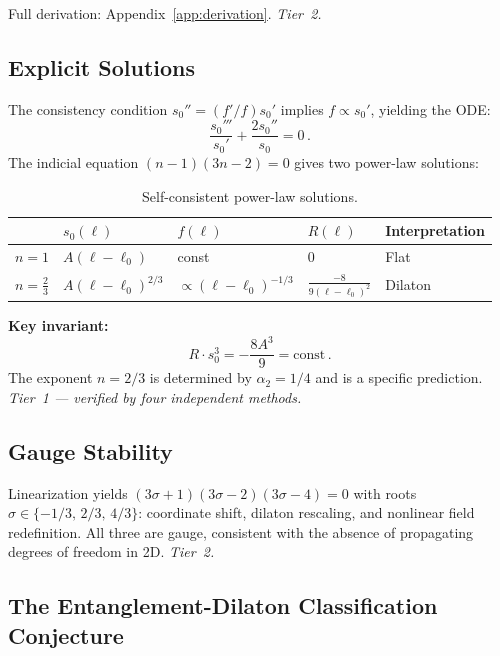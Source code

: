 \documentclass[aps,prd,twocolumn,superscriptaddress,nofootinbib,floatfix]{revtex4-2}
\newcommand{\sn}{s_0}
\begin{document}
Full derivation: Appendix~\ref{app:derivation}. \emph{Tier~2.}

\subsection{Explicit Solutions}

The consistency condition $\sn'' = (f'/f)\sn'$ implies $f \propto \sn'$, yielding the ODE:
\begin{equation}
\label{eq:ODE}
\frac{\sn'''}{\sn'} + \frac{2\sn''}{\sn} = 0\,.
\end{equation}
The indicial equation $(n-1)(3n-2) = 0$ gives two power-law solutions:

\begin{table}[ht!]
\centering
\begin{tabular}{@{}lllll@{}}
\toprule
& $\sn(\ell)$ & $f(\ell)$ & $R(\ell)$ & Interpretation \\
\midrule
$n{=}1$ & $A(\ell{-}\ell_0)$ & const & $0$ & Flat \\
$n{=}\frac{2}{3}$ & $A(\ell{-}\ell_0)^{2/3}$ & $\propto (\ell{-}\ell_0)^{-1/3}$ & $\frac{-8}{9(\ell{-}\ell_0)^2}$ & Dilaton \\
\bottomrule
\end{tabular}
\caption{Self-consistent power-law solutions.}
\label{tab:solutions}
\end{table}

\textbf{Key invariant:}
\begin{equation}
\label{eq:invariant}
R \cdot \sn^3 = -\frac{8A^3}{9} = \text{const}\,.
\end{equation}
The exponent $n = 2/3$ is determined by $\alpha_2 = 1/4$ and is a specific prediction. \emph{Tier~1 --- verified by four independent methods.}

\subsection{Gauge Stability}
\label{sec:stability}

Linearization yields $(3\sigma{+}1)(3\sigma{-}2)(3\sigma{-}4) = 0$ with roots $\sigma \in \{-1/3,\, 2/3,\, 4/3\}$: coordinate shift, dilaton rescaling, and nonlinear field redefinition. All three are gauge, consistent with the absence of propagating degrees of freedom in 2D. \emph{Tier~2.}

\subsection{The Entanglement-Dilaton Classification Conjecture}
\label{sec:classification}
\end{document}
